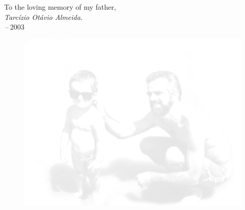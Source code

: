 \thispagestyle{empty}
{}

\vspace*{3cm}

\begin{center}
    To the loving memory of my father, \\ \smallskip
    \emph{Tarc\'izio Ot\'avio Almeida}. \\ \,--\,2003
\end{center}

\begin{figure}[!htb]
        \myfloatalign
        {\includegraphics[width=.66\linewidth]{gfx/dad.png}}
\end{figure}